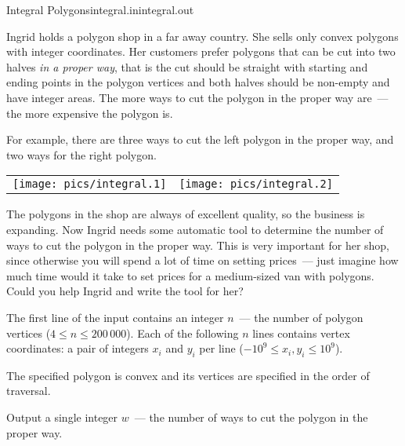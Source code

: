 \begin{problem}{Integral Polygons}{integral.in}{integral.out}{\timeLimit}


Ingrid holds a polygon shop in a far away country. She sells only convex
polygons with integer coordinates. Her customers
prefer polygons that can be cut into two halves \emph{in a proper way}, that is
the cut should be straight with starting and ending points in the polygon vertices
and both halves should be non-empty and have integer areas.
The more ways to cut the polygon in the proper way are~--- the more expensive the polygon is.

For example, there are three ways to cut the left polygon in the proper way,
and two ways for the right polygon.

\begin{center}
\begin{tabular}{cc}
    \texttt{[image: pics/integral.1]} &
    \texttt{[image: pics/integral.2]}
\end{tabular}
\end{center}

The polygons in the shop are always of excellent quality, so the business is expanding.
Now Ingrid needs some automatic tool to determine the number of ways to cut
the polygon in the proper way. This is very important for her shop, since otherwise you
will spend a lot of time on setting prices~--- just imagine how
much time would it take to set prices for a medium-sized van with polygons. 
Could you help Ingrid and write the tool for her?

\InputFile

The first line of the input contains an integer $n$~---
the number of polygon vertices ($4 \leq n \leq 200\,000$).
Each of the following $n$ lines contains vertex coordinates: 
a pair of integers $x_i$ and $y_i$ per line ($-10^9 \le x_i, y_i \le 10^9$).

The specified polygon is convex and its vertices are specified in the order of traversal.

\OutputFile

Output a single integer $w$~--- the number of ways to cut the polygon in the proper way.

\Example

\begin{example}
%
%
\end{example}

\end{problem}
